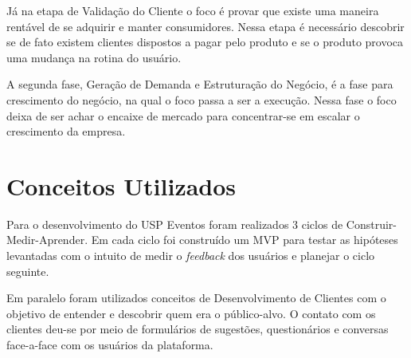 \par Já na etapa de Validação do Cliente o foco é provar que existe uma maneira rentável de se adquirir e manter consumidores. Nessa etapa é necessário descobrir se de fato existem clientes dispostos a pagar pelo produto e se o produto provoca uma mudança na rotina do usuário.
\par A segunda fase, Geração de Demanda e Estruturação do Negócio, é a fase para crescimento do negócio, na qual o foco passa a ser a execução. Nessa fase o foco deixa de ser achar o encaixe de mercado para concentrar-se em escalar o crescimento da empresa.

\section{Conceitos Utilizados}
\par Para o desenvolvimento do USP Eventos foram realizados 3 ciclos de Construir-Medir-Aprender. Em cada ciclo foi construído um MVP para testar as hipóteses levantadas com o intuito de medir o \emph{feedback} dos usuários e planejar o ciclo seguinte.
\par Em paralelo foram utilizados conceitos de Desenvolvimento de Clientes com o objetivo de entender e descobrir quem era o público-alvo.  O contato com os clientes deu-se por meio de formulários de sugestões, questionários e conversas face-a-face com os usuários da plataforma.